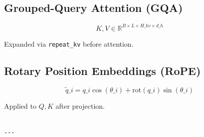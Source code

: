 \subsection{Grouped-Query Attention (GQA)}

\[
K, V \in \mathbb{R}^{B \times L \times H\_{kv} \times d\_h}
\tag{3.7}
\]

Expanded via \texttt{repeat\_kv} before attention.

\subsection{Rotary Position Embeddings (RoPE)}

\[
\tilde{q}\_i = q\_i \cos(\theta\_i) + \text{rot}(q\_i) \sin(\theta\_i)
\tag{3.8}
\]

Applied to $Q, K$ after projection.
\begin{lstlisting}

---
\end{lstlisting}